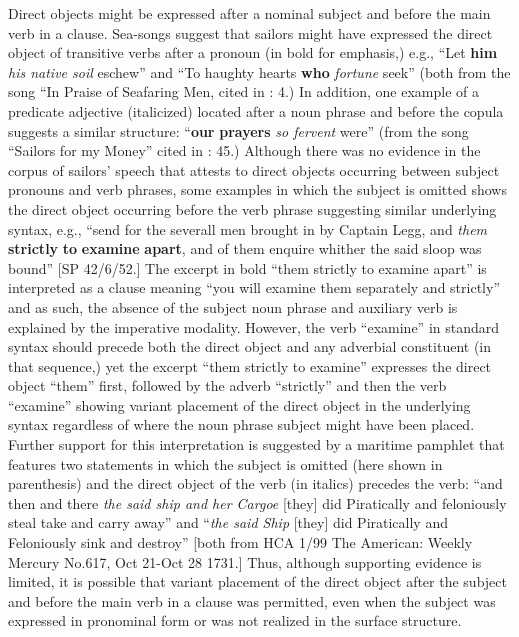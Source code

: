 Direct objects might be expressed after a nominal subject and before the main verb in a clause. Sea-songs suggest that sailors might have expressed the direct object of transitive verbs after a pronoun (in bold for emphasis,) e.g., “Let \textbf{him} \textit{his native soil} eschew” and “To haughty hearts \textbf{who} \textit{fortune} seek” (both from the song “In Praise of Seafaring Men, cited in \citealt{Palmer1986}: 4.) In addition, one example of a predicate adjective (italicized) located after a noun phrase and before the copula suggests a similar structure: “\textbf{our} \textbf{prayers} \textit{so fervent} were” (from the song “Sailors for my Money” cited in \citealt{Palmer1986}: 45.) Although there was no evidence in the corpus of sailors’ speech that attests to direct objects occurring between subject pronouns and verb phrases, some examples in which the subject is omitted shows the direct object occurring before the verb phrase suggesting similar underlying syntax, e.g., “send for the severall men brought in by Captain Legg, and \textit{them} \textbf{strictly} \textbf{to} \textbf{examine} \textbf{apart}, and of them enquire whither the said sloop was bound” [SP 42/6/52.] The excerpt in bold “them strictly to examine apart” is interpreted as a clause meaning “you will examine them separately and strictly” and as such, the absence of the subject noun phrase and auxiliary verb is explained by the imperative modality. However, the verb “examine” in standard syntax should precede both the direct object and any adverbial constituent (in that sequence,) yet the excerpt “them strictly to examine” expresses the direct object “them” first, followed by the adverb “strictly” and then the verb “examine” showing variant placement of the direct object in the underlying syntax regardless of where the noun phrase subject might have been placed. Further support for this interpretation is suggested by a maritime pamphlet that features two statements in which the subject is omitted (here shown in parenthesis) and the direct object of the verb (in italics) precedes the verb: “and then and there \textit{the said ship and her Cargoe} [they] did Piratically and feloniously steal take and carry away” and “\textit{the said Ship} [they] did Piratically and Feloniously sink and destroy” [both from HCA 1/99 The American: Weekly Mercury No.617, Oct 21-Oct 28 1731.] Thus, although supporting evidence is limited, it is possible that variant placement of the direct object after the subject and before the main verb in a clause was permitted, even when the subject was expressed in pronominal form or was not realized in the surface structure. 


